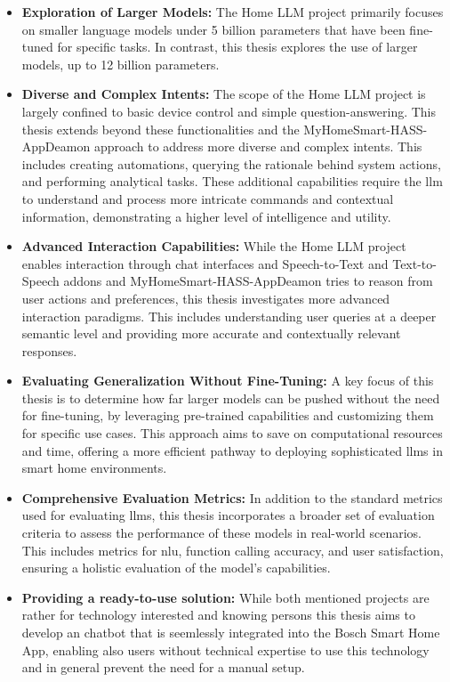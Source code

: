 \begin{itemize}
\item \textbf{Exploration of Larger Models:} The Home LLM project primarily focuses on smaller language models under 5 billion parameters that have been fine-tuned for specific tasks. In contrast, this thesis explores the use of larger models, up to 12 billion parameters.

\item \textbf{Diverse and Complex Intents:} The scope of the Home LLM project is largely confined to basic device control and simple question-answering. This thesis extends beyond these functionalities and the MyHomeSmart-HASS-AppDeamon approach to address more diverse and complex intents. This includes creating automations, querying the rationale behind system actions, and performing analytical tasks. These additional capabilities require the \gls{llm} to understand and process more intricate commands and contextual information, demonstrating a higher level of intelligence and utility.

\item \textbf{Advanced Interaction Capabilities:} While the Home LLM project enables interaction through chat interfaces and Speech-to-Text and Text-to-Speech addons and MyHomeSmart-HASS-AppDeamon tries to reason from user actions and preferences, this thesis investigates more advanced interaction paradigms. This includes understanding user queries at a deeper semantic level and providing more accurate and contextually relevant responses.

\item \textbf{Evaluating Generalization Without Fine-Tuning:} A key focus of this thesis is to determine how far larger models can be pushed without the need for fine-tuning, by leveraging pre-trained capabilities and customizing them for specific use cases. This approach aims to save on computational resources and time, offering a more efficient pathway to deploying sophisticated \glspl{llm} in smart home environments.

\item \textbf{Comprehensive Evaluation Metrics:} In addition to the standard metrics used for evaluating \glspl{llm}, this thesis incorporates a broader set of evaluation criteria to assess the performance of these models in real-world scenarios. This includes metrics for \gls{nlu}, function calling accuracy, and user satisfaction, ensuring a holistic evaluation of the model's capabilities.

\item \textbf{Providing a ready-to-use solution:} While both mentioned projects are rather for technology interested and knowing persons this thesis aims to develop an chatbot that is seemlessly integrated into the Bosch Smart Home App, enabling also users without technical expertise to use this technology and in general prevent the need for a manual setup.
\end{itemize}

